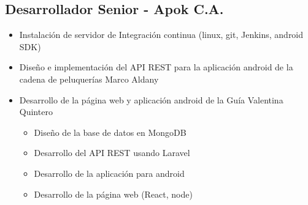 \documentclass[letterpaper,11pt]{report}
\begin{document}
\subsection*{Desarrollador Senior - Apok C.A.}
  \begin{itemize}
    \item Instalación de servidor de Integración continua (linux, git, Jenkins, android SDK)
    \item Diseño e implementación del API REST para la aplicación android de la cadena de peluquerías Marco Aldany
    \item Desarrollo de la página web y aplicación android de la Guía Valentina Quintero
      \begin{itemize}
        \item Diseño de la base de datos en MongoDB
        \item Desarrollo del API REST usando Laravel
        \item Desarrollo de la aplicación para android
        \item Desarrollo de la página web (React, node)
      \end{itemize}
  \end{itemize}
\end{document}
